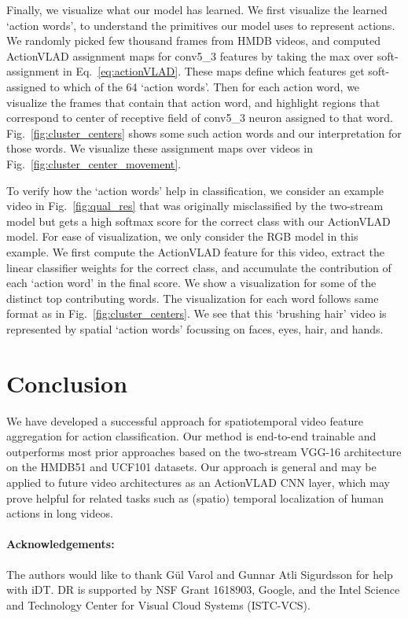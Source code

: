\documentclass[10pt,twocolumn,letterpaper]{article}
\newcommand{\methodTag}[0]{ActionVLAD}
\begin{document}
Finally, we visualize what our model has learned.
We first visualize the learned `action words', to understand the primitives
our model uses to represent actions. We randomly picked few thousand frames from
HMDB videos, and computed \methodTag{} assignment maps for conv5\_3
features by taking the max 
over soft-assignment in Eq.~\ref{eq:actionVLAD}.
These maps define which features 
get soft-assigned to which of the 64 `action words'.
Then for each action word, we visualize the
frames that contain that action word, and highlight 
regions that correspond to center of 
receptive field of conv5\_3 neuron assigned to that word.
Fig.~\ref{fig:cluster_centers} shows some such action
words and our interpretation for those words.
We visualize 
these assignment maps 
over videos in Fig.~\ref{fig:cluster_center_movement}.

To verify how the `action words' help in classification, we consider 
an example video in Fig.~\ref{fig:qual_res} that was originally misclassified
by the two-stream model but gets a high softmax score for the correct class with our
\methodTag{}
model. For ease of visualization, we only consider the RGB model in this example. 
We first compute the \methodTag{} feature for this video, extract the linear
classifier weights for the correct class, and accumulate the contribution
of each `action word' in the final score. We show a visualization for some
of the distinct top contributing words. The visualization for each word follows same
format as in Fig.~\ref{fig:cluster_centers}. We see that this `brushing hair' video
is represented by spatial `action words' 
focussing on faces, eyes, hair, and hands.
 \section{Conclusion}


We have developed a successful approach for spatiotemporal video feature aggregation for action classification. Our method is end-to-end trainable and outperforms most prior approaches based on the two-stream VGG-16 architecture on the HMDB51 and UCF101 datasets. Our approach is general and may be applied to future video architectures as an ActionVLAD CNN layer, which may prove helpful for related tasks such as (spatio) temporal localization of human actions in long videos.

 {\footnotesize
\paragraph{Acknowledgements:}
The authors would like to thank G{\"u}l Varol and Gunnar
Atli Sigurdsson for help with iDT.
DR is supported by NSF Grant 1618903, Google, and the Intel Science and Technology Center for Visual Cloud Systems (ISTC-VCS).
}
 
\end{document}
